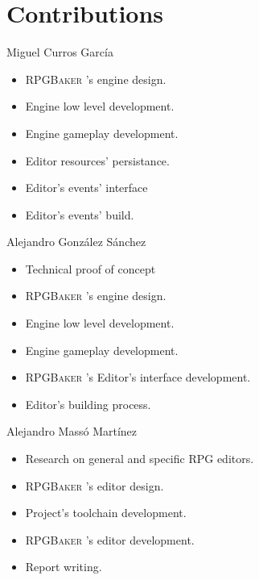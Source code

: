 \documentclass{beamer}
\newcommand{\baker}{%
	\textsc{RPGBaker}%
}
\begin{document}
\section{Contributions}
\begin{frame}{Miguel Curros García}
	\begin{itemize}
		\item \baker{}'s engine design.
		\item Engine low level development.
		\item Engine gameplay development.
		\item Editor resources' persistance.
		\item Editor's events' interface
		\item Editor's events' build.
	\end{itemize}
\end{frame}

\begin{frame}{Alejandro González Sánchez}
	\begin{itemize}
		\item Technical proof of concept
		\item \baker{}'s engine design.
		\item Engine low level development.
		\item Engine gameplay development.
		\item \baker{}'s Editor's interface development.
		\item Editor's building process.
	\end{itemize}
\end{frame}

\begin{frame}{Alejandro Massó Martínez}
	\begin{itemize}
		\item Research on general and specific RPG editors.
		\item \baker{}'s editor design.
		\item Project's toolchain development.
		\item \baker{}'s editor development.
		\item Report writing.
	\end{itemize}
\end{frame}
\end{document}
